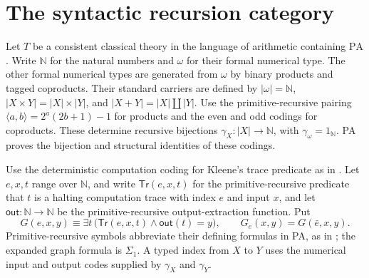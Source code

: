 \documentclass[11pt]{article}
\newcommand{\N}{\mathbb N}
\newcommand{\PA}{\mathrm{PA}}
\begin{document}
\section{The syntactic recursion category}\label{sec:syntactic}

Let $T$ be a consistent classical theory in the language of arithmetic
containing $\PA$. Write $\N$ for the natural numbers and $\omega$
for their formal numerical type. The other formal numerical types are
generated from $\omega$ by binary products and tagged coproducts.
Their standard carriers are defined by
$|\omega|=\N$, $|X\times Y|=|X|\times|Y|$, and
$|X+Y|=|X|\amalg|Y|$.
Use the primitive-recursive pairing
$\langle a,b\rangle=2^a(2b+1)-1$ for products and the even and
odd codings for coproducts. These determine recursive bijections
$\gamma_X:|X|\to\N$, with $\gamma_\omega=1_\N$.
PA proves the bijection and structural identities of these codings.

Use the deterministic computation coding for Kleene's trace
predicate as in \cite[p.~115, Note~1]{Montagna}.
Let $e,x,t$ range over $\N$, and write
$\mathsf{Tr}(e,x,t)$ for the primitive-recursive predicate
that $t$ is a halting computation trace with index $e$ and input
$x$, and let $\mathsf{out}:\N\to\N$ be the primitive-recursive
output-extraction function. Put
\[
 G(e,x,y)\equiv
 \exists t\,\bigl(\mathsf{Tr}(e,x,t)\land\mathsf{out}(t)=y\bigr),
 \qquad G_e(x,y)=G(\bar e,x,y).
\]
Primitive-recursive symbols abbreviate their defining formulas in
PA, as in \cite[p.~644]{DPM}; the expanded graph formula is $\Sigma_1$.
A typed index from $X$ to $Y$ uses the numerical input and output
codes supplied by $\gamma_X$ and $\gamma_Y$.
\end{document}
